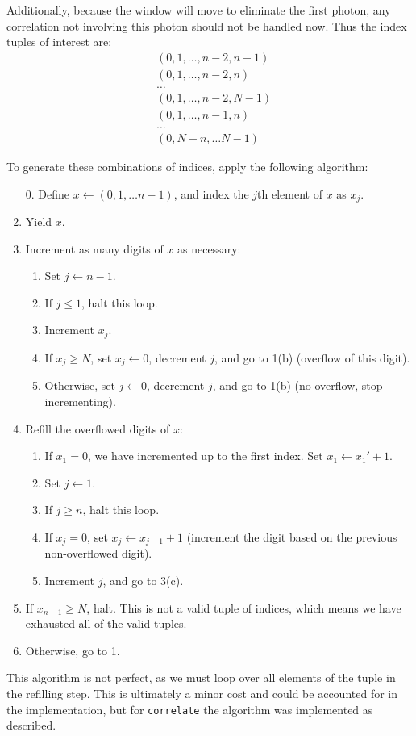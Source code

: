 \documentclass{article}
\newcommand{\correlate}{\texttt{correlate}}
\begin{document}
Additionally, because the window will move to eliminate the first photon, any correlation not involving this photon should not be handled now. Thus the index tuples of interest are:
\begin{align*}
&(0,1,\ldots,n-2, n-1)\\
&(0,1,\ldots,n-2, n)\\
&\ldots\\
&(0,1,\ldots,n-2,N-1)\\
&(0,1,\ldots,n-1,n)\\
&\ldots\\
&(0,N-n,\ldots N-1)
\end{align*}

To generate these combinations of indices, apply the following algorithm:
\begin{enumerate}
\item[0.] Define $x\leftarrow(0,1,\ldots n-1)$, and index the $j$th element of $x$ as $x_{j}$. 
\item Yield $x$.
\item Increment as many digits of $x$ as necessary:
  \begin{enumerate}
  \item Set $j\leftarrow n-1$.  
  \item If $j\le 1$, halt this loop.
  \item Increment $x_{j}$. 
  \item If $x_{j}\ge N$, set $x_{j}\leftarrow 0$, decrement $j$, and go to 1(b) (overflow of this digit).
  \item Otherwise, set $j\leftarrow 0$, decrement $j$, and go to 1(b) (no overflow, stop incrementing).
  \end{enumerate}
\item Refill the overflowed digits of $x$:
 \begin{enumerate}
 \item If $x_{1}=0$, we have incremented up to the first index. Set $x_{1}\leftarrow x_{1}'+1$.
 \item Set $j\leftarrow 1$.
 \item If $j\ge n$, halt this loop.
 \item If $x_{j}=0$, set $x_{j}\leftarrow x_{j-1}+1$ (increment the digit based on the previous non-overflowed digit).
 \item Increment $j$, and go to 3(c).
 \end{enumerate}
\item If $x_{n-1}\ge N$, halt. This is not a valid tuple of indices, which means we have exhausted all of the valid tuples.
\item Otherwise, go to 1.
\end{enumerate}
This algorithm is not perfect, as we must loop over all elements of the tuple in the refilling step. This is ultimately a minor cost and could be accounted for in the implementation, but for \correlate{} the algorithm was implemented as described.
\end{document}
